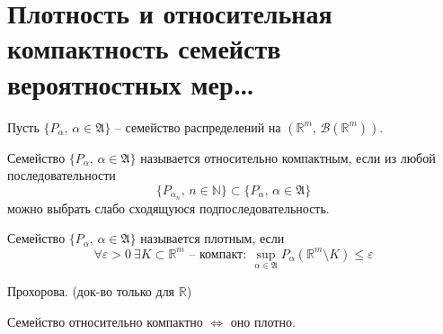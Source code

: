 \section{Плотность и относительная компактность семейств вероятностных мер\dots}
Пусть $\{P_\alpha,\, \alpha \in \mathfrak{A}\}$ -- семейство распределений на $(\mathbb{R}^m,\, \mathcal{B}(\mathbb{R}^m))$.
\begin{definition}
  Семейство $\{P_\alpha,\, \alpha \in \mathfrak{A}\}$ называется относительно компактным, если из любой последовательности
  \[\{P_{\alpha_n},\, n \in \mathbb{N}\} \subset \{P_\alpha,\, \alpha \in \mathfrak{A}\}\]
  можно выбрать слабо сходящуюся подпоследовательность.
\end{definition}

\begin{definition}
  Семейство $\{P_\alpha,\, \alpha \in \mathfrak{A}\}$ называется плотным, если
  \[\forall \varepsilon > 0 \: \exists K \subset \mathbb{R}^m\text{ -- компакт} :\: \sup_{\alpha \in \mathfrak{A}}P_\alpha(\mathbb{R}^m \setminus K) \leq \varepsilon\]
\end{definition}

\begin{theorem}
  Прохорова. (док-во только для $\mathbb{R}$)

  Семейство относительно компактно $\Leftrightarrow$ оно плотно.
\end{theorem}

